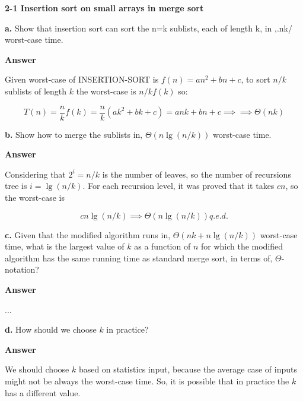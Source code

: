 \documentclass[11pt]{article}          %
\begin{document}

\textbf{2-1 Insertion sort on small arrays in merge sort}

\textbf{a.} Show that insertion sort can sort the n=k sublists, each of length k, in ‚.nk/ worst-case time.

\textbf{Answer}

Given worst-case of INSERTION-SORT is $f(n) = an^2 + bn + c$, to sort $n/k$ sublists of length
$k$ the worst-case is $n/kf(k)$ so:

\begin{equation*}
  T(n) = \frac{n}{k} f(k) = \frac{n}{k} (ak^2 + bk + c) = ank + bn + c \implies \implies \Theta (nk)
\end{equation*}

\textbf{b.} Show how to merge the sublists in‚ $\Theta (n \lg(n/k))$ worst-case time.

\textbf{Answer}

Considering that $2^i = n/k$ is the number of leaves, so the number of recursions tree is $i = \lg (n/k)$.
For each recursion level, it was proved that it takes $cn$, so the worst-case is

\begin{equation*}
  cn \lg (n/k) \implies \Theta (n \lg (n/k)) q.e.d.
\end{equation*}

\textbf{c.} Given that the modified algorithm runs in, $\Theta (nk + n \lg (n/k))$ worst-case time,
what is the largest value of $k$ as a function of $n$ for which the modified algorithm has the same
running time as standard merge sort, in terms of‚ $\Theta$-notation?

\textbf{Answer}

...

\textbf{d.} How should we choose $k$ in practice?

\textbf{Answer}

We should choose $k$ based on statistics input, because the average case of inputs might not
be always the worst-case time. So, it is possible that in practice the $k$ has a different
value.
\end{document}
